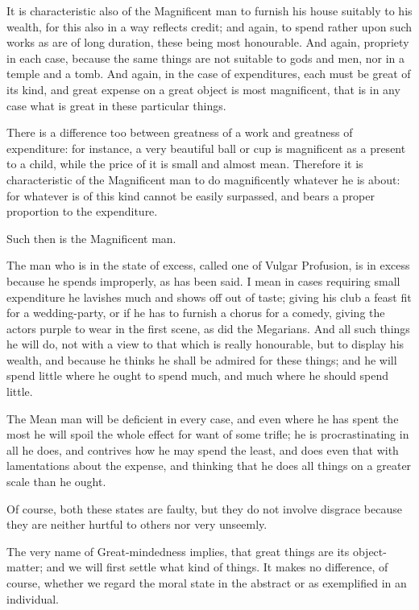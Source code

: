 It is characteristic also of the Magnificent man to furnish his house suitably
to his wealth, for this also in a way reflects credit; and again, to spend
rather upon such works as are of long duration, these being most honourable.
And again, propriety in each case, because the same things are not suitable to
gods and men, nor in a temple and a tomb. And again, in the case of
expenditures, each must be great of its kind, and great expense on a great
object is most magnificent, that is in any case what is great in these
particular things.

There is a difference too between greatness of a work and greatness of
expenditure: for instance, a very beautiful ball or cup is magnificent as a
present to a child, while the price of it is small and almost mean. Therefore
it is characteristic of the Magnificent man to do magnificently whatever he is
about: for whatever is of this kind cannot be easily surpassed, and bears a
proper proportion to the expenditure.

Such then is the Magnificent man.

The man who is in the state of excess, called one of Vulgar Profusion, is in
excess because he spends improperly, as has been said. I mean in cases
requiring small expenditure he lavishes much and shows off out of taste; giving
his club a feast fit for a wedding-party, or if he has to furnish a chorus for
a comedy, giving the actors purple to wear in the first scene, as did the
Megarians. And all such things he will do, not with a view to that which is
really honourable, but to display his wealth, and because he thinks he shall be
admired for these things; and he will spend little where he ought to spend
much, and much where he should spend little.

The Mean man will be deficient in every case, and even where he has spent the
most he will spoil the whole effect for want of some trifle; he is
procrastinating in all he does, and contrives how he may spend the least, and
does even that with lamentations about the expense, and thinking that he does
all things on a greater scale than he ought.

Of course, both these states are faulty, but they do not involve disgrace
because they are neither hurtful to others nor very unseemly.


The very name of Great-mindedness implies, that great things are its
object-matter; and we will first settle what kind of things. It makes no
difference, of course, whether we regard the moral state in the abstract or as
exemplified in an individual.


